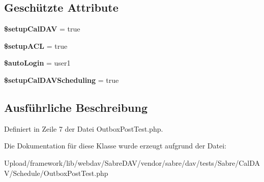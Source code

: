\subsection*{Geschützte Attribute}
\begin{DoxyCompactItemize}
\item 
\mbox{\label{class_sabre_1_1_cal_d_a_v_1_1_schedule_1_1_outbox_post_test_a0bc36762042e07e4f4a38db463d194ee}} 
{\bfseries \$setup\+Cal\+D\+AV} = true
\item 
\mbox{\label{class_sabre_1_1_cal_d_a_v_1_1_schedule_1_1_outbox_post_test_ae6ecc6ebb9fee2e491aaa165aa8ef75a}} 
{\bfseries \$setup\+A\+CL} = true
\item 
\mbox{\label{class_sabre_1_1_cal_d_a_v_1_1_schedule_1_1_outbox_post_test_a163fca52091c455187f112579dec1670}} 
{\bfseries \$auto\+Login} = \textquotesingle{}user1\textquotesingle{}
\item 
\mbox{\label{class_sabre_1_1_cal_d_a_v_1_1_schedule_1_1_outbox_post_test_a39736818228d43b90edf4317fb68ebfa}} 
{\bfseries \$setup\+Cal\+D\+A\+V\+Scheduling} = true
\end{DoxyCompactItemize}


\subsection{Ausführliche Beschreibung}


Definiert in Zeile 7 der Datei Outbox\+Post\+Test.\+php.



Die Dokumentation für diese Klasse wurde erzeugt aufgrund der Datei\+:\begin{DoxyCompactItemize}
\item 
Upload/framework/lib/webdav/\+Sabre\+D\+A\+V/vendor/sabre/dav/tests/\+Sabre/\+Cal\+D\+A\+V/\+Schedule/Outbox\+Post\+Test.\+php\end{DoxyCompactItemize}
